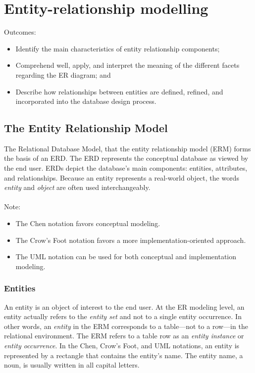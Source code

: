 \documentclass[a4paper, 12pt, titlepage]{report}
\begin{document}
{\chapter{Entity-relationship modelling}
Outcomes:
\begin{itemize}
\item Identify the main characteristics of entity relationship components;
\item Comprehend well, apply, and interpret the meaning of the different facets regarding the ER diagram; and
\item Describe how relationships between entities are defined, refined, and incorporated into the database design process.
\end{itemize}
\section{The Entity Relationship Model}
The Relational Database Model,
that the entity relationship model (ERM) forms the basis of an ERD. The ERD represents the conceptual database as viewed by the end user. ERDs depict the database’s main components: entities, attributes, and relationships. Because an entity represents a real-world object, the words \emph{entity} and \emph{object} are often used interchangeably.\\
\\Note:
\begin{itemize}
\item The Chen notation favors conceptual modeling.
\item The Crow’s Foot notation favors a more implementation-oriented approach.
\item The UML notation can be used for both conceptual and implementation modeling.
\end{itemize}
\subsection{Entities}
An entity is an object of interest to the end user. At the ER modeling level, an entity actually refers to the \emph{entity set} and not to a single entity occurrence. In other words, an \emph{entity} in the ERM corresponds to a table—not to a row—in the relational environment. The ERM refers to a table row as an \emph{entity instance} or \emph{entity occurrence}. In the Chen, Crow’s Foot, and UML notations, an entity is represented by a rectangle that contains the entity’s name. The entity name, a noun, is usually written in all capital letters.
}
\end{document}

